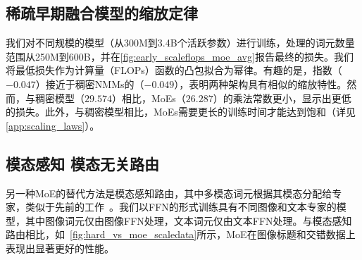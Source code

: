 \vspace{15pt}
\subsection{稀疏早期融合模型的缩放定律}
我们对不同规模的模型（从300M到3.4B个活跃参数）进行训练，处理的词元数量范围从250M到600B，并在\cref{fig:early_scaleflops_moe_avg}报告最终的损失。我们将最低损失作为计算量（FLOPs）函数的凸包拟合为幂律。有趣的是，指数（$-0.047$）接近于稠密NMMs的（$-0.049$），表明两种架构具有相似的缩放特性。然而，与稠密模型（$29.574$）相比，MoEs（$26.287$）的乘法常数更小，显示出更低的损失。此外，与稠密模型相比，MoEs需要更长的训练时间才能达到饱和（详见\cref{app:scaling_laws}）。


\subsection{模态感知 \vs 模态无关路由}

另一种MoE的替代方法是模态感知路由，其中多模态词元根据其模态分配给专家，类似于先前的工作~\citep{bao2021vlmo,wang2022image}。我们以FFN的形式训练具有不同图像和文本专家的模型，其中图像词元仅由图像FFN处理，文本词元仅由文本FFN处理。与模态感知路由相比，如~\cref{fig:hard_vs_moe_scaledata}所示，MoE在图像标题和交错数据上表现出显著更好的性能。


\begin{figure}[t!]
    \begin{minipage}[t]{0.58\textwidth}
                    
    \end{minipage}
    \hfill
    \begin{minipage}[t]{0.38\textwidth}
        
    \end{minipage}
\end{figure}


